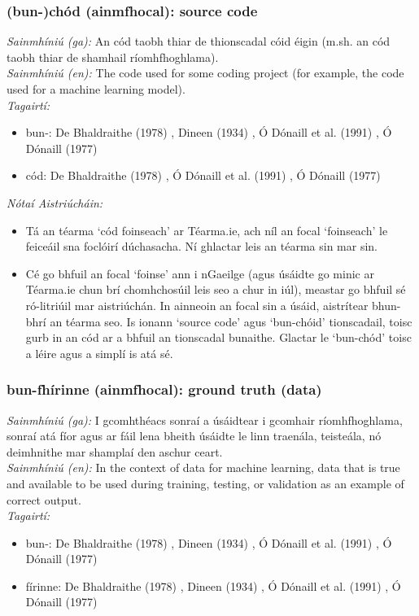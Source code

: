 \subsubsection*{(bun-)chód (ainmfhocal): source code}
 \noindent \textit{Sainmhíniú (ga):} An cód taobh thiar de thionscadal cóid éigin (m.sh. an cód taobh thiar de shamhail ríomhfhoghlama).
\\
 \noindent \textit{Sainmhíniú (en):} The code used for some coding project (for example, the code used for a machine learning model).
\\
 \noindent \textit{Tagairtí:}
\begin{itemize}
	\item bun-: De Bhaldraithe (1978) \cite{de-bhaldraithe}, Dineen (1934) \cite{dineen}, Ó Dónaill et al. (1991) \cite{focloir-beag}, Ó Dónaill (1977) \cite{odonaill}
	\item cód: De Bhaldraithe (1978) \cite{de-bhaldraithe}, Ó Dónaill et al. (1991) \cite{focloir-beag}, Ó Dónaill (1977) \cite{odonaill}
\end{itemize}

 \noindent \textit{Nótaí Aistriúcháin:}
\begin{itemize}
	\item Tá an téarma `cód foinseach' ar Téarma.ie, ach níl an focal `foinseach' le feiceáil sna foclóirí dúchasacha. Ní ghlactar leis an téarma sin mar sin.
	\item Cé go bhfuil an focal `foinse' ann i nGaeilge (agus úsáidte go minic ar Téarma.ie chun brí chomhchosúil leis seo a chur in iúl), meastar go bhfuil sé ró-litriúil mar aistriúchán. In ainneoin an focal sin a úsáid, aistrítear bhun-bhrí an téarma seo. Is ionann `source code' agus `bun-chóid' tionscadail, toisc gurb in an cód ar a bhfuil an tionscadal bunaithe. Glactar le `bun-chód' toisc a léire agus a simplí is atá sé.
\end{itemize}


\subsubsection*{bun-fhírinne (ainmfhocal): ground truth (data)}
 \noindent \textit{Sainmhíniú (ga):} I gcomhthéacs sonraí a úsáidtear i gcomhair ríomhfhoghlama, sonraí atá fíor agus ar fáil lena bheith úsáidte le linn traenála, teisteála, nó deimhnithe mar shamplaí den aschur ceart.
\\
 \noindent \textit{Sainmhíniú (en):} In the context of data for machine learning, data that is true and available to be used during training, testing, or validation as an example of correct output.
\\
 \noindent \textit{Tagairtí:}
\begin{itemize}
	\item bun-: De Bhaldraithe (1978) \cite{de-bhaldraithe}, Dineen (1934) \cite{dineen}, Ó Dónaill et al. (1991) \cite{focloir-beag}, Ó Dónaill (1977) \cite{odonaill}
	\item fírinne: De Bhaldraithe (1978) \cite{de-bhaldraithe}, Dineen (1934) \cite{dineen}, Ó Dónaill et al. (1991) \cite{focloir-beag}, Ó Dónaill (1977) \cite{odonaill}
\end{itemize}

